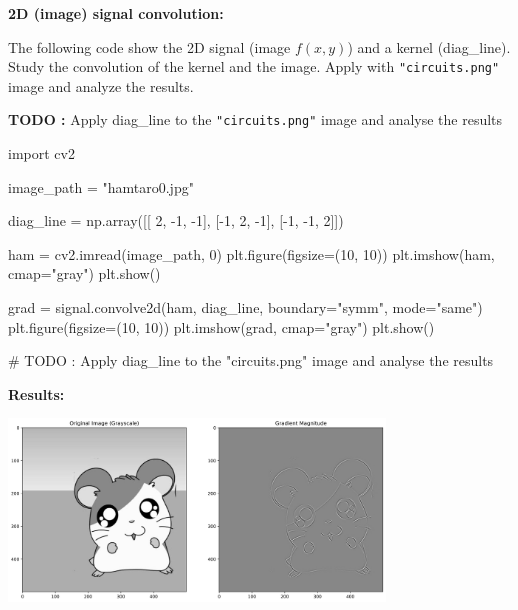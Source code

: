 \documentclass[a4paper, 10pt]{article}
\begin{document}
\begin{problem}
\textbf{2D (image) signal convolution:}

\vspace{2mm}

\par\noindent The following code show the 2D signal (image \( f(x, y) \)) and a kernel (diag\_line).
Study the convolution of the kernel and the image. Apply with \texttt{"circuits.png"} image and analyze the results.

\vspace{2mm}

\par\noindent\textbf{TODO :} Apply diag\_line to the \texttt{"circuits.png"} image and analyse the results

\begin{codingbox}
import cv2

image_path = "hamtaro0.jpg"

diag_line = np.array([[ 2, -1, -1],
                    [-1, 2, -1],
                    [-1, -1, 2]])

ham = cv2.imread(image_path, 0)
plt.figure(figsize=(10, 10))
plt.imshow(ham, cmap="gray")
plt.show()

grad = signal.convolve2d(ham, diag_line, boundary="symm", mode="same")
plt.figure(figsize=(10, 10))
plt.imshow(grad, cmap="gray")
plt.show()

# TODO : Apply diag_line to the "circuits.png" image and analyse the results
\end{codingbox}

\par\noindent \textbf{Results:} \par\noindent \vspace{3mm}
\begin{center}
    \includegraphics[width=0.75\textwidth]{images/problem_7_hamtaro_gradient.png}
\end{center}
\end{problem}
\end{document}
